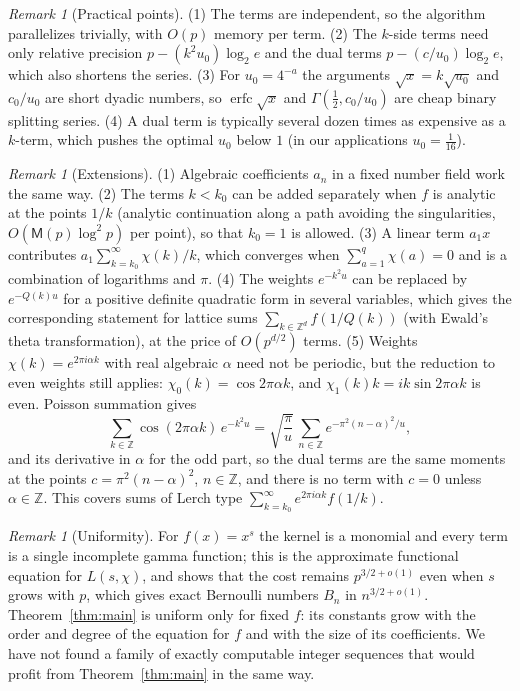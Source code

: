 \documentclass[11pt]{amsart}
\theoremstyle{definition}
\theoremstyle{remark}
\newtheorem{remark}[theorem]{Remark}
\newcommand{\erfc}{\operatorname{erfc}}
\newcommand{\ZZ}{\mathbb{Z}}
\newcommand{\Mul}{\mathsf{M}}
\begin{document}
\begin{remark}[Practical points]\label{rem:practical}
(1) The terms are independent, so the algorithm parallelizes trivially, with $O(p)$ memory per term. (2) The
$k$-side terms need only relative precision $p - (k^2u_0)\log_2 e$ and the dual terms $p - (c/u_0)\log_2e$,
which also shortens the series. (3) For $u_0 = 4^{-a}$ the arguments $\sqrt x = k\sqrt{u_0}$ and $c_0/u_0$ are
short dyadic numbers, so $\erfc\sqrt x$ and $\Gamma(\frac12, c_0/u_0)$ are cheap binary splitting series. (4) A
dual term is typically several dozen times as expensive as a $k$-term, which pushes the optimal $u_0$ below
$1$ (in our applications $u_0 = \frac1{16}$).
\end{remark}

\begin{remark}[Extensions]\label{rem:ext}
(1) Algebraic coefficients $a_n$ in a fixed number field work the same way. (2) The terms $k < k_0$ can be
added separately when $f$ is analytic at the points $1/k$ (analytic continuation along a path avoiding the
singularities, $O(\Mul(p)\log^2p)$ per point), so that $k_0 = 1$ is allowed. (3) A linear term $a_1 x$ contributes
$a_1\sum_{k=k_0}^{\infty}\chi(k)/k$, which converges when $\sum_{a=1}^{q}\chi(a) = 0$ and is a combination of logarithms and
$\pi$. (4) The weights $e^{-k^2u}$ can be replaced by $e^{-Q(k)u}$ for a positive definite quadratic form in
several variables, which gives the corresponding statement for lattice sums $\sum_{k \in \ZZ^d} f(1/Q(k))$
(with Ewald's theta transformation), at the price of $O(p^{d/2})$ terms. (5) Weights $\chi(k) = e^{2\pi i\alpha k}$
with real algebraic $\alpha$ need not be periodic, but the reduction to even weights still applies:
$\chi_0(k) = \cos 2\pi\alpha k$, and $\chi_1(k)k = i k\sin 2\pi\alpha k$ is even. Poisson summation gives
\[
  \sum_{k\in\ZZ}\cos(2\pi\alpha k)\,e^{-k^2u} = \sqrt{\frac\pi u}\,\sum_{n\in\ZZ}e^{-\pi^2(n-\alpha)^2/u},
\]
and its derivative in $\alpha$ for the odd part, so the dual terms are the same moments at the points $c = \pi^2(n-\alpha)^2$, $n \in \ZZ$, and
there is no term with $c = 0$ unless $\alpha \in \ZZ$. This covers sums of Lerch type $\sum_{k=k_0}^{\infty} e^{2\pi i\alpha k}f(1/k)$.
\end{remark}

\begin{remark}[Uniformity]\label{rem:uniform}
For $f(x) = x^s$ the kernel is a monomial and every term is a single incomplete gamma function; this is the
approximate functional equation for $L(s,\chi)$, and \cite{Joh21} shows that the cost remains
$p^{3/2+o(1)}$ even when $s$ grows with $p$, which gives exact Bernoulli numbers $B_n$ in $n^{3/2+o(1)}$.
Theorem~\ref{thm:main} is uniform only for fixed $f$: its constants grow with the order and degree of the
equation for $f$ and with the size of its coefficients. We have not found a family of exactly computable
integer sequences that would profit from Theorem~\ref{thm:main} in the same way.
\end{remark}
\end{document}

